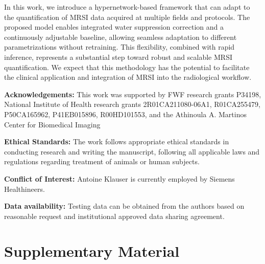 \documentclass{article}
\begin{document}
    In this work, we introduce a hypernetwork-based framework that can adapt to the quantification of MRSI data acquired at multiple fields and protocols. The proposed model enables integrated water suppression correction and a continuously adjustable baseline, allowing seamless adaptation to different parametrizations without retraining. This flexibility, combined with rapid inference, represents a substantial step toward robust and scalable MRSI quantification. We expect that this methodology has the potential to facilitate the clinical application and integration of MRSI into the radiological workflow.


\vspace{1cm}
\noindent\textbf{Acknowledgements: }This work was supported by FWF research grants P34198, National Institute of Health research grants 2R01CA211080-06A1, R01CA255479, P50CA165962, P41EB015896, R00HD101553, and the Athinoula A. Martinos Center for Biomedical Imaging

\noindent\textbf{Ethical Standards: } The work follows appropriate ethical standards in conducting research and writing the manuscript, following all applicable laws and regulations regarding treatment of animals or human subjects.

\noindent\textbf{Conflict of Interest: } Antoine Klauser is currently employed by Siemens Healthineers.

\noindent\textbf{Data availability: } Testing data can be obtained from the authors based on reasonable request and institutional approved data sharing agreement.



\newpage
\clearpage


\section*{Supplementary Material}
\setcounter{figure}{0}
\setcounter{table}{0}
\renewcommand{\figurename}{Supplementary Figure} 
\renewcommand{\tablename}{Supplementary Table} 
\end{document}
